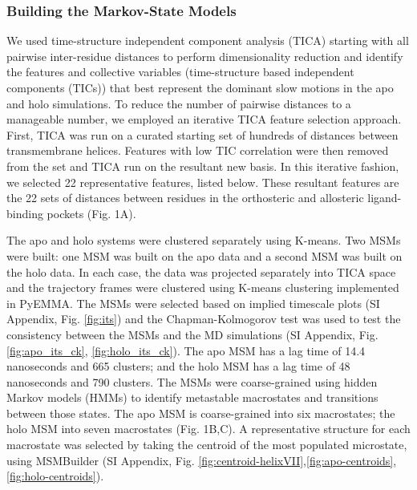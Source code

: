 \subsubsection{Building the Markov-State Models}
We used time-structure independent component analysis (TICA)\cite{Schwantes2013, Perez-Hernandez2013,Nuske2014} starting with all pairwise inter-residue distances to perform dimensionality reduction and identify the features and collective variables (time-structure based independent components (TICs)) that best represent the dominant slow motions in the apo and holo simulations.
To reduce the number of pairwise distances to a manageable number, we employed an iterative TICA feature selection approach.
First, TICA was run on a curated starting set of hundreds of distances between transmembrane helices.
Features with low TIC correlation were then removed from the set and TICA run on the resultant new basis.
In this iterative fashion, we selected 22 representative features, listed below.
These resultant features are the 22 sets of distances between residues in the orthosteric and allosteric ligand-binding pockets (Fig. 1A).

The apo and holo systems were clustered separately using K-means.
Two MSMs were built: one MSM was built on the apo data and a second MSM was built on the holo data.
In each case, the data was projected separately into TICA space and the trajectory frames were clustered using K-means clustering implemented in PyEMMA\cite{Scherer2015}.
The MSMs were selected based on implied timescale plots (SI Appendix, Fig. \ref{fig:its}) and the Chapman-Kolmogorov test\cite{Prinz2011a} was used to test the consistency between the MSMs and the MD simulations (SI Appendix, Fig. \ref{fig:apo_its_ck}, \ref{fig:holo_its_ck}).
The apo MSM has a lag time of 14.4 nanoseconds and 665 clusters; and the holo MSM has a lag time of 48 nanoseconds and 790 clusters.
The MSMs were coarse-grained using hidden Markov models (HMMs)\cite{Noe2013a} to identify metastable macrostates and transitions between those states.
The apo MSM is coarse-grained into six macrostates; the holo MSM into seven macrostates (Fig. 1B,C).
A representative structure for each macrostate was selected by taking the centroid of the most populated microstate, using MSMBuilder\cite{Beauchamp2011} (SI Appendix, Fig. \ref{fig:centroid-helixVII},\ref{fig:apo-centroids}, \ref{fig:holo-centroids}).


